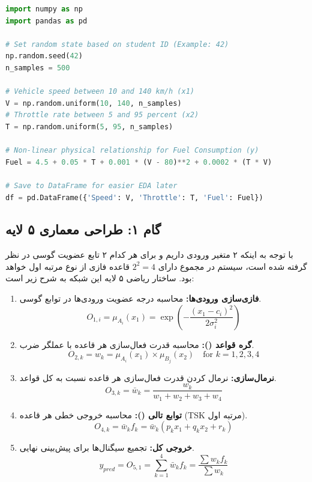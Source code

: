 \documentclass{article}
\begin{document}
\begin{latin}
	\begin{lstlisting}[language=Python, caption={Dataset Generation for Fuel Consumption (Synthetic)}]
import numpy as np
import pandas as pd

# Set random state based on student ID (Example: 42)
np.random.seed(42)
n_samples = 500

# Vehicle speed between 10 and 140 km/h (x1)
V = np.random.uniform(10, 140, n_samples)
# Throttle rate between 5 and 95 percent (x2)
T = np.random.uniform(5, 95, n_samples)

# Non-linear physical relationship for Fuel Consumption (y)
Fuel = 4.5 + 0.05 * T + 0.001 * (V - 80)**2 + 0.0002 * (T * V)

# Save to DataFrame for easier EDA later
df = pd.DataFrame({'Speed': V, 'Throttle': T, 'Fuel': Fuel})
	\end{lstlisting}
\end{latin}

\subsection{گام ۱: طراحی معماری ۵ لایه }

با توجه به اینکه ۲ متغیر ورودی داریم و برای هر کدام ۲ تابع عضویت گوسی در نظر گرفته شده است، سیستم در مجموع دارای $2^2 = 4$ قاعده فازی از نوع  مرتبه اول خواهد بود. ساختار ریاضی ۵ لایه این شبکه به شرح زیر است:

\begin{tcolorbox}[
	colback=lightmutednavy,
	colframe=mutednavy,
	title=معادلات لایه‌های \lr{ANFIS},
	fonttitle=\bfseries\large,
	coltitle=white,
	arc=3mm
	]
	\begin{enumerate}[label=\textbf{لایه \arabic* :}, leftmargin=*]
		\item \textbf{فازی‌سازی ورودی‌ها:} محاسبه درجه عضویت ورودی‌ها در توابع گوسی.
		$$ O_{1,i} = \mu_{A_i}(x_1) = \exp\left(-\frac{(x_1 - c_i)^2}{2\sigma_i^2}\right) $$
		\item \textbf{گره قواعد ():} محاسبه قدرت فعال‌سازی هر قاعده با عملگر ضرب.
		$$ O_{2,k} = w_k = \mu_{A_i}(x_1) \times \mu_{B_j}(x_2) \quad \text{for } k=1,2,3,4 $$
		\item \textbf{نرمال‌سازی:} نرمال کردن قدرت فعال‌سازی هر قاعده نسبت به کل قواعد.
		$$ O_{3,k} = \bar{w}_k = \frac{w_k}{w_1 + w_2 + w_3 + w_4} $$
		\item \textbf{توابع تالی ():} محاسبه خروجی خطی هر قاعده (TSK مرتبه اول).
		$$ O_{4,k} = \bar{w}_k f_k = \bar{w}_k (p_k x_1 + q_k x_2 + r_k) $$
		\item \textbf{خروجی کل:} تجمیع سیگنال‌ها برای پیش‌بینی نهایی.
		$$ y_{pred} = O_{5,1} = \sum_{k=1}^{4} \bar{w}_k f_k = \frac{\sum w_k f_k}{\sum w_k} $$
	\end{enumerate}
\end{tcolorbox}
\end{document}
